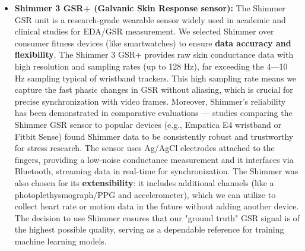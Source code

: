 \documentclass[11pt,a4paper]{report}
\begin{document}
\begin{itemize}
\item \textbf{Shimmer 3 GSR+ (Galvanic Skin Response sensor):} The Shimmer GSR
  unit is a research-grade wearable sensor widely used in academic and
  clinical studies for EDA/GSR measurement. We selected Shimmer over
  consumer fitness devices (like smartwatches) to ensure \textbf{data accuracy
  and flexibility}. The Shimmer 3 GSR+ provides raw skin conductance
  data with high resolution and sampling rates (up to 128
  Hz)\cite{GSRPPGMachineLearning2024},
  far exceeding the 4---10 Hz sampling typical of wristband trackers.
  This high sampling rate means we capture the fast phasic changes in
  GSR without aliasing, which is crucial for precise synchronization
  with video frames. Moreover, Shimmer's reliability has been
  demonstrated in comparative evaluations --- studies comparing the
  Shimmer GSR sensor to popular devices (e.g., Empatica E4 wristband or
  Fitbit Sense) found Shimmer data to be consistently robust and
  trustworthy for stress
  research\cite{GSRPPGMachineLearning2024}.
  The sensor uses Ag/AgCl electrodes attached to the fingers, providing
  a low-noise conductance measurement and it interfaces via Bluetooth,
  streaming data in real-time for synchronization. The Shimmer was also
  chosen for its \textbf{extensibility}: it includes additional channels
  (like a photoplethysmograph/PPG and accelerometer), which we can
  utilize to collect heart rate or motion data in the future without
  adding another
  device\cite{GSRPPGMachineLearning2024}.
  The decision to use Shimmer ensures that our "ground truth" GSR signal
  is of the highest possible quality, serving as a dependable reference
  for training machine learning models.


\end{itemize}
\end{document}
